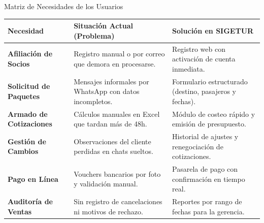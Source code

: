 \documentclass[aspectratio=169, 10pt]{beamer}
\begin{document}
\begin{frame}{Matriz de Necesidades de los Usuarios}
    \footnotesize
    \begin{table}[H]
    \centering
    \renewcommand{\arraystretch}{1.2}
    \begin{tabularx}{\textwidth}{lLL}
    \hline
    \textbf{Necesidad} & \textbf{Situación Actual (Problema)} & \textbf{Solución en SIGETUR} \\ \hline
    \textbf{Afiliación de Socios} & Registro manual o por correo que demora en procesarse. & Registro web con activación de cuenta inmediata. \\ \hline
    \textbf{Solicitud de Paquetes} & Mensajes informales por WhatsApp con datos incompletos. & Formulario estructurado (destino, pasajeros y fechas). \\ \hline
    \textbf{Armado de Cotizaciones} & Cálculos manuales en Excel que tardan más de 48h. & Módulo de costeo rápido y emisión de presupuesto. \\ \hline
    \textbf{Gestión de Cambios} & Observaciones del cliente perdidas en chats sueltos. & Historial de ajustes y renegociación de cotizaciones. \\ \hline
    \textbf{Pago en Línea} & Vouchers bancarios por foto y validación manual. & Pasarela de pago con confirmación en tiempo real. \\ \hline
    \textbf{Auditoría de Ventas} & Sin registro de cancelaciones ni motivos de rechazo. & Reportes por rango de fechas para la gerencia. \\ \hline
    \end{tabularx}
    \end{table}
\end{frame}
\end{document}
